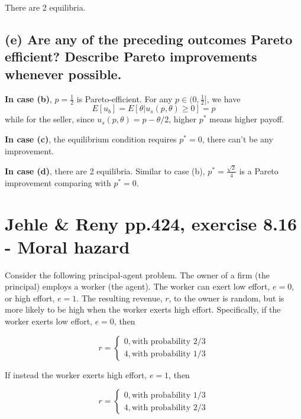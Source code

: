 \documentclass{article}
\begin{document}
There are 2 equilibria.

\subsection*{(e) Are any of the preceding outcomes Pareto efficient? Describe Pareto improvements whenever
possible.}

\textbf{In case (b)}, $p=\tfrac12$ is Pareto-efficient. For any $p \in (0, \tfrac12]$, we have $$E[u_b] = E[\theta|u_s(p, \theta) \ge 0 ] = p$$
while for the seller, since $u_s(p, \theta) = p - \theta/2$, higher $p^*$ means higher payoff.

\textbf{In case (c)}, the equilibrium condition requires $p^*=0$, there can't be any improvement.

\textbf{In case (d)}, there are 2 equilibria. Similar to case (b), $p^*=\frac{\sqrt{2}}{4}$ is a Pareto improvement comparing
with $p^*=0$.


\bigskip

\section{Jehle \& Reny pp.424, exercise 8.16 - Moral hazard}

Consider the following principal-agent problem. The owner of a firm (the principal) employs a
worker (the agent). The worker can exert low effort, $e = 0$, or high effort, $e = 1$. The resulting
revenue, $r$, to the owner is random, but is more likely to be high when the worker exerts high effort.
Specifically, if the worker exerts low effort, $e = 0$, then


\begin{equation}
r =
    \begin{cases}
0, \text{with probability 2/3} \\
4, \text{with probability 1/3}
    \end{cases}
\nonumber
\end{equation}
	

If instead the worker exerts high effort, $e = 1$, then

\begin{equation}
r =
    \begin{cases}
0, \text{with probability 1/3} \\
4, \text{with probability 2/3}
    \end{cases}
\nonumber
\end{equation}
\end{document}
